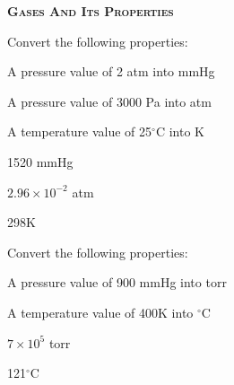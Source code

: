 \documentclass[main.tex]{subfiles}
\begin{document}
\newpage
\setdoublesep{0.35700 em}  %
\setatomsep{1.78500 em}    %
\setbondoffset{0.18265 em} %
\newcommand{\bondwidth}{0.06642 em} %
\setbondstyle{line width = \bondwidth}
\fancyhfoffset[E,O]{0pt}
\setlength{\columnsep}{30pt}
\begin{conclusion}
\end{conclusion}
\begin{multicols*}{2}\setcounter{numA}{1}

{\raggedright\textsc{\textbf{Gases And Its Properties }}\par}

\begin{question}[ID=\the\value{numA}]
Convert the following properties:
\begin{inparaenum}[(a)]	
\item  A pressure value of 2 atm into mmHg
\item  A pressure value of 3000 Pa into atm
\item  A temperature value of 25$^{\circ}$C into K
\end{inparaenum} 
\end{question}
\begin{solution}
\begin{inparaenum}[(a)]	
\item  1520 mmHg
\item $2.96\times 10^{-2}$ atm
\item 298K
\end{inparaenum} 
\hspace{0.1cm}\end{solution}%
\begin{question}[ID=\the\value{numA}]
Convert the following properties:
\begin{inparaenum}[(a)]	
\item  A pressure value of 900 mmHg into torr
\item  A temperature value of 400K into $^{\circ}$C
\end{inparaenum} 
\end{question}
\begin{solution}
\begin{inparaenum}[(a)]	
\item  $7\times 10^{5}$ torr
\item 121$^{\circ}$C
\end{inparaenum} 
\hspace{0.1cm}\end{solution}%





\end{multicols*}
\end{document}
